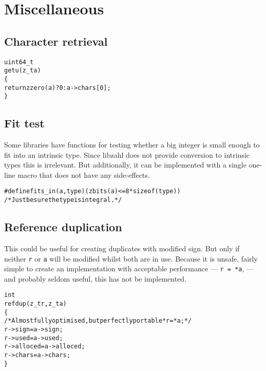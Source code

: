 \newpage
\section{Miscellaneous}
\label{sec:Miscellaneous}


\subsection{Character retrieval}
\label{sec:Character retrieval}

\begin{alltt}
uint64_t
getu(z_t a)
\{
    return zzero(a) ? 0 : a->chars[0];
\}
\end{alltt}

\subsection{Fit test}
\label{sec:Fit test}

Some libraries have functions for testing
whether a big integer is small enough to
fit into an intrinsic type. Since libzahl
does not provide conversion to intrinsic
types this is irrelevant. But additionally,
it can be implemented with a single
one-line macro that does not have any
side-effects.

\begin{alltt}
   #define fits_in(a, type)  (zbits(a) <= 8 * sizeof(type))
   \textcolor{c}{/* \textrm{Just be sure the type is integral.} */}
\end{alltt}


\subsection{Reference duplication}
\label{sec:Reference duplication}

This could be useful for creating duplicates
with modified sign. But only if neither
{\tt r} or {\tt a} will be modified whilst
both are in use. Because it is unsafe,
fairly simple to create an implementation
with acceptable performance — {\tt *r = *a},
— and probably seldom useful, this has not
be implemented.

\begin{alltt}
   int
   refdup(z_t r, z_t a)
   \{
       \textcolor{c}{/* \textrm{Almost fully optimised, but perfectly portable} *r = *a; */}
       r->sign    = a->sign;
       r->used    = a->used;
       r->alloced = a->alloced;
       r->chars   = a->chars;
   \}
\end{alltt}


